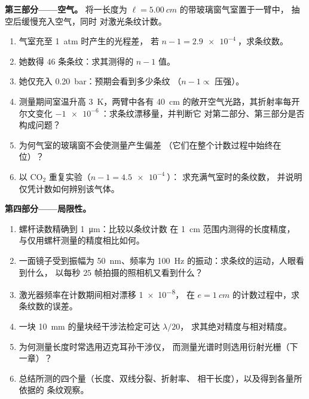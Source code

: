\begin{problem}
\medskip
\noindent\textbf{第三部分——空气。}
将一长度为 $\ell = \qty{5.00}{cm}$ 的带玻璃窗气室置于一臂中，
抽空后缓慢充入空气，同时
对激光条纹计数。
\begin{enumerate}[resume]
  \item 气室充至 \qty{1}{atm} 时产生的光程差，
        若 $n - 1 = \qty{2.9e-4}{}$，求条纹数。
  \item 她数得 $46$ 条条纹：求其测得的 $n - 1$ 值。
  \item 她仅充入 \qty{0.20}{bar}：预期会看到多少条纹
        （$n - 1 \propto$ 压强）。
  \item 测量期间室温升高 \qty{3}{K}，两臂中各有
        \qty{40}{cm} 的敞开空气光路，其折射率每开尔文变化
        $-\qty{1e-6}{}$：求条纹漂移量，并判断它
        对第二部分、第三部分是否构成问题？
  \item 为何气室的玻璃窗不会使测量产生偏差
        （它们在整个计数过程中始终在位）？
  \item 以 CO$_2$ 重复实验（$n - 1 = \qty{4.5e-4}{}$）：
        求充满气室时的条纹数，
        并说明仅凭计数如何辨别该气体。
\end{enumerate}

\medskip
\noindent\textbf{第四部分——局限性。}
\begin{enumerate}[resume]
  \item 螺杆读数精确到 \qty{1}{\micro m}：比较以条纹计数
        在 \qty{1}{cm} 范围内测得的长度精度，
        与仅用螺杆测量的精度相比如何。
  \item 一面镜子受到振幅为 \qty{50}{nm}、频率为 \qty{100}{Hz}
        的振动：求条纹的运动，人眼看到什么，
        以每秒 $25$ 帧拍摄的照相机又看到什么？
  \item 激光器频率在计数期间相对漂移 \qty{1e-8}{}，
        在 $e = \qty{1}{cm}$ 的计数过程中，求条纹数的误差。
  \item 一块 \qty{10}{mm} 的量块经干涉法检定可达 $\lambda/20$，
        求其绝对精度与相对精度。
  \item 为何测量长度时常选用迈克耳孙干涉仪，
        而测量光谱时则选用衍射光栅（下一章）？
  \item 总结所测的四个量（长度、双线分裂、折射率、
        相干长度），以及得到各量所依据的
        条纹观察。
\end{enumerate}
\end{problem}
